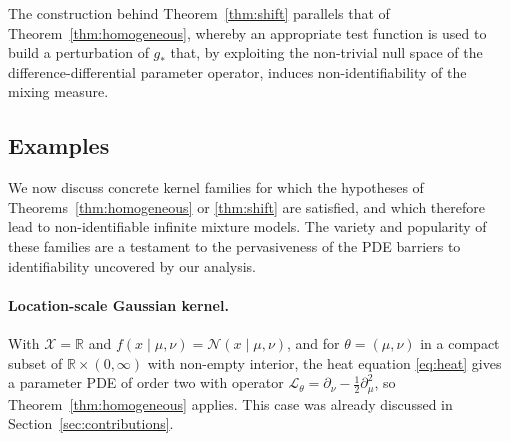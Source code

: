 \documentclass[11pt,twoside]{article} %
\begin{document}
The construction behind Theorem~\ref{thm:shift} parallels that of Theorem~\ref{thm:homogeneous}, whereby an appropriate test function is used to build a perturbation of $g_*$ that, by exploiting the non-trivial null space of the difference-differential parameter operator, induces non-identifiability of the mixing measure. 

\subsection{Examples}\label{sec:pde_examples}

We now discuss concrete kernel families for which the hypotheses of Theorems~\ref{thm:homogeneous} or \ref{thm:shift} are satisfied, and which therefore lead to non-identifiable infinite mixture models. %
The variety and popularity of these families are a testament to the pervasiveness of the PDE barriers to identifiability uncovered by our analysis. %

\paragraph{Location-scale Gaussian kernel.} With $\mathcal X=\mathbb R$ and $f(x\mid\mu,\nu)=\mathcal N(x\mid\mu,\nu)$, and for $\theta=(\mu,\nu)$ in a compact subset of $\mathbb R\times(0,\infty)$ with non-empty interior, the heat equation \eqref{eq:heat} gives a parameter PDE of order two with operator $\mathcal L_\theta=\partial_\nu-\frac12\partial^2_\mu$, so Theorem~\ref{thm:homogeneous} applies. This case was already discussed in Section~\ref{sec:contributions}.
\end{document}
